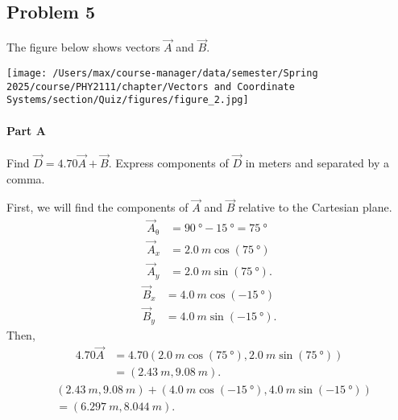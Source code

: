 
\newpage

\subsection{Problem 5}

The figure below shows vectors $\vec{A}$ and $\vec{B}$.

\begin{center}
	\texttt{[image: /Users/max/course-manager/data/semester/Spring 2025/course/PHY2111/chapter/Vectors and Coordinate Systems/section/Quiz/figures/figure\_2.jpg]}
\end{center}

\setcounter{partcounter}{1}
\paragraph{Part A}

Find $\vec{D} = 4.70 \vec{A} + \vec{B}$. Express components of $\vec{D}$ in meters and separated by a comma.

\begin{solution}
	First, we will find the components of $\vec{A}$ and $\vec{B}$ relative to the Cartesian plane.
	\begin{align*}
		\vec{A}_{\mathrm{\theta}} &= \SI{90}{\degree} - \SI{15}{\degree} = \SI{75}{\degree} \\
		\vec{A}_{x} &= \SI{2.0}{m} \cos \left( \SI{75}{\degree} \right) \\
		\vec{A}_{y} &= \SI{2.0}{m} \sin \left( \SI{75}{\degree} \right)
		.\end{align*}
	\begin{align*}
		\vec{B}_{x} &= \SI{4.0}{m} \cos \left( \SI{-15}{\degree} \right) \\
		\vec{B}_{y} &= \SI{4.0}{m} \sin \left( \SI{-15}{\degree} \right)
		.\end{align*}
	Then,
	\begin{align*}
		4.70 \vec{A} &= 4.70 \left( \SI{2.0}{m} \cos \left( \SI{75}{\degree} \right), \SI{2.0}{m} \sin \left( \SI{75}{\degree} \right) \right) \\
		&= \left( \SI{2.43}{m}, \SI{9.08}{m} \right)
		.\end{align*}
	\begin{align*}
		&\left( \SI{2.43}{m}, \SI{9.08}{m} \right) + \left( \SI{4.0}{m} \cos \left( \SI{-15}{\degree} \right), \SI{4.0}{m} \sin \left( \SI{-15}{\degree} \right) \right) \\
		&= \left( \SI{6.297}{m}, \SI{8.044}{m} \right)
		.\end{align*}
\end{solution}
